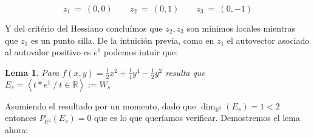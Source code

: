 \documentclass[11pt]{book}
\newcommand{\R}{{\mathbb{R}}}
\newcommand{\ip}[1]{\left\langle#1\right\rangle}
\numberwithin{theorem}{subsection}
\newtheorem{lemma}[theorem]{Lema}
\begin{document}
\[
z_1 \ = \ (0,0) \qquad z_2 \ = \ (0,1) \qquad z_3 \ = \ (0,-1)
\]

Y del crit\'erio del Hessiano conclu\'imos que $z_2, z_3$ son m\'inimos locales mientras que $z_1$ es un punto silla. De la intuici\'on previa, como en $z_1$ el autovector asociado al autovalor positivo es $e^1$ podemos intuir que:

\begin{lemma}
	Para $f(x, y) = \frac{1}{2}x^2 + \frac{1}{4}y^4 - \frac{1}{2}y^2$ resulta que $E_s = \ip{t*e^1 \ / \ t \in \R}:= W_s$
\end{lemma}

Asumiendo el resultado por un momento, dado que $\dim_{\R^2}\left(E_s\right) =1 < 2$ entonces $P_{\R^2}(E_s) = 0$ que es lo que quer\'iamos verificar. Demostremos el lema ahora:
\end{document}
